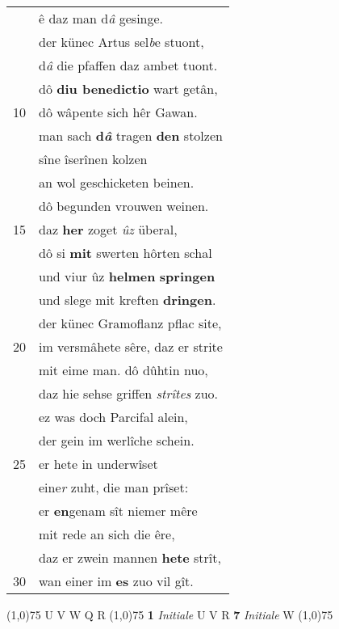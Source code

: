 \documentclass[8pt,a4paper,notitlepage]{article}
\begin{document}
\begin{table}[ht]
\begin{minipage}[t]{0.5\linewidth}
\begin{tabular}{rl}
 & ê daz man d\textit{â} gesinge.\\ 
 & der künec Artus sel\textit{b}e stuont,\\ 
 & d\textit{â} die pfaffen daz ambet tuont.\\ 
 & dô \textbf{diu benedictio} wart getân,\\ 
10 & dô wâpente sich hêr Gawan.\\ 
 & man sach \textbf{d\textit{â}} tragen \textbf{den} stolzen\\ 
 & sîne îserînen kolzen\\ 
 & an wol geschicketen beinen.\\ 
 & dô begunden vrouwen weinen.\\ 
15 & daz \textbf{her} zoget \textit{ûz} überal,\\ 
 & dô si \textbf{mit} swerten hôrten schal\\ 
 & und viur ûz \textbf{helmen} \textbf{springen}\\ 
 & und slege mit kreften \textbf{dringen}.\\ 
 & der künec Gramoflanz pflac site,\\ 
20 & im versmâhete sêre, daz er strite\\ 
 & mit eime man. dô dûhtin nuo,\\ 
 & daz hie sehse griffen \textit{strîtes} zuo.\\ 
 & ez was doch Parcifal alein,\\ 
 & der gein im werlîche schein.\\ 
25 & er hete in underwîset\\ 
 & eine\textit{r} zuht, die man prîset:\\ 
 & er \textbf{en}genam sît niemer mêre\\ 
 & mit rede an sich die êre,\\ 
 & daz er zwein mannen \textbf{hete} strît,\\ 
30 & wan einer im \textbf{es} zuo vil gît.\\ 
\end{tabular}
\scriptsize
\line(1,0){75} \newline
U V W Q R \newline
\line(1,0){75} \newline
\textbf{1} \textit{Initiale} U V R  \textbf{7} \textit{Initiale} W  \newline
\line(1,0){75} \newline

\end{minipage}
\end{table}
\end{document}
